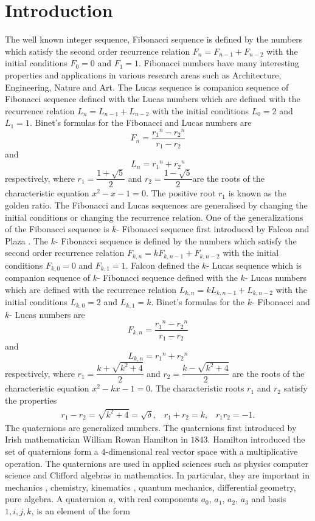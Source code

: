 \section{Introduction}
The well known integer sequence, Fibonacci sequence is defined by the
numbers which satisfy the second order recurrence relation $F_n = F_{n-1}+F_{n-2}$ with the initial conditions $F_0 = 0$ and $F_1 = 1$. Fibonacci numbers have many interesting properties and applications in various research areas such as Architecture, Engineering, Nature and Art. The Lucas sequence is companion sequence of Fibonacci sequence defined with the Lucas numbers which are defined with the recurrence relation $L_n = L_{n-1}+L_{n-2}$ with the initial conditions $L_0 = 2$ and $L_1 = 1$. Binet's formulas for the Fibonacci and Lucas numbers are 
$$F_n=\dfrac{{r_1}^n-{r_2}^n}{r_1-r_2}$$ and $$L_n={r_1}^n+{r_2}^n$$ respectively, where $r_1 = \dfrac{1+\sqrt{5}}{2}$ and $r_2=\dfrac{1-\sqrt{5}}{2}$are the roots of the characteristic equation $x^2 - x -1 = 0$. The positive root $r_1$ is known as the golden ratio. The Fibonacci and Lucas  sequences are generalised by changing the initial conditions or changing the recurrence relation. One of the generalizations of the Fibonacci sequence is $k$- Fibonacci sequence first introduced by Falcon and Plaza \cite{4}. The $k$- Fibonacci sequence is defined by the numbers which satisfy the second order recurrence relation $F_{k,n} = kF_{k,n-1}+F_{k,n-2}$ with the initial conditions $F_{k,0} = 0$ and $F_{k,1} = 1$. Falcon \cite{6} defined the $k$- Lucas sequence which is companion sequence of $k$- Fibonacci sequence defined with the $k$- Lucas numbers which are defined with the recurrence relation $L_{k,n} = kL_{k,n-1}+L_{k,n-2}$ with the initial conditions $L_{k,0} = 2$ and $L_{k,1} = k$. Binet's formulas for the $k$- Fibonacci and $k$- Lucas numbers are $$F_{k, n}=\dfrac{{r_1}^n-{r_2}^n}{r_1-r_2}$$ and $$L_{k,n}={r_1}^n+{r_2}^n$$ respectively, where $r_1 = \dfrac{k+\sqrt{k^2+4}}{2}$ and $r_2=\dfrac{k-\sqrt{k^2+4}}{2}$ are the roots of the characteristic equation $x^2 - kx -1 = 0$.  The characteristic roots $r_1$ and $r_2$ satisfy the properties  
 \begin{align*} 
   r_{1}-r_{2} = \sqrt{k^2+4}= \sqrt{\delta}\text{,}
 \quad r_{1}+r_{2}=k\text{,}\quad r_{1}r_{2}=-1.
\end{align*}
\noindent The quaternions are generalized numbers. The quaternions first introduced by Irish mathematician William Rowan Hamilton in $1843$. Hamilton \cite{27} introduced the set of quaternions form a $4$-dimensional real vector space with a multiplicative operation. The quaternions are used in applied sciences such as physics  computer science and Clifford algebras in mathematics. In particular, they are important in mechanics \cite{14}, chemistry\cite{16}, kinematics \cite{15}, quantum mechanics\cite{17}, differential geometry, pure algebra. A quaternion $a$, with real components $a_0$, $a_1$, $a_2$, $a_3$ and basis $1, i, j,k$, is an element of the form 
